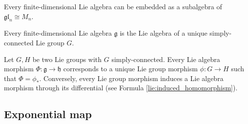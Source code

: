     \begin{theorem}[Ado]\label{lie:ado}
        Every finite-dimensional Lie algebra can be embedded as a subalgebra of $\mathfrak{gl}_n\cong M_n$.
    \end{theorem}
    \begin{theorem}
        Every finite-dimensional Lie algebra $\mathfrak{g}$ is the Lie algebra of a unique simply-connected Lie group $G$.
    \end{theorem}

    \begin{property}\label{lie:prop_hom}
        Let $G,H$ be two Lie groups with $G$ simply-connected. Every Lie algebra morphism $\Phi:\mathfrak{g}\rightarrow\mathfrak{h}$ corresponds to a unique Lie group morphism $\phi:G\rightarrow H$ such that $\Phi=\phi_*$. Conversely, every Lie group morphism induces a Lie algebra morphism through its differential (see Formula \ref{lie:induced_homomorphism}).
    \end{property}


\subsection{Exponential map}

